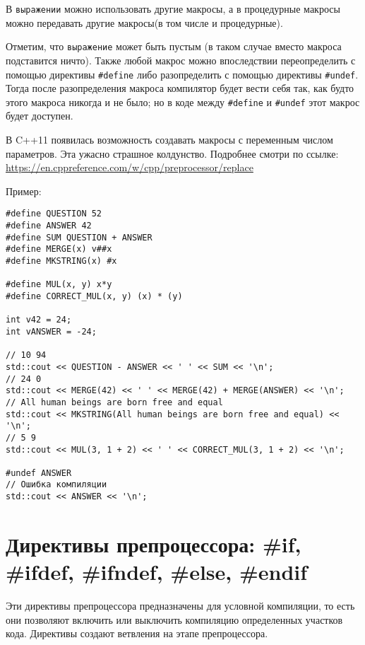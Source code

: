 \documentclass[14pt, a4paper]{extarticle}
\begin{document}
В \verb|выражении| можно использовать другие макросы, а в процедурные макросы можно передавать
другие макросы(в том числе и процедурные).

Отметим, что \verb|выражение| может быть пустым (в таком случае
вместо макроса подставится ничто). Также любой макрос можно впоследствии переопределить
с помощью директивы \verb|#define| либо разопределить с помощью директивы \verb|#undef|.
Тогда после разопределения макроса компилятор будет вести себя так, как будто этого
макроса никогда и не было; но в коде между \verb|#define| и \verb|#undef| этот макрос
будет доступен.

{\small В C++11 появилась возможность создавать макросы с переменным числом параметров.
Эта ужасно страшное колдунство. Подробнее смотри по ссылке:
\url{https://en.cppreference.com/w/cpp/preprocessor/replace}}

Пример:
\begin{verbatim}
#define QUESTION 52
#define ANSWER 42
#define SUM QUESTION + ANSWER
#define MERGE(x) v##x
#define MKSTRING(x) #x

#define MUL(x, y) x*y
#define CORRECT_MUL(x, y) (x) * (y)

int v42 = 24;
int vANSWER = -24;

// 10 94
std::cout << QUESTION - ANSWER << ' ' << SUM << '\n';
// 24 0
std::cout << MERGE(42) << ' ' << MERGE(42) + MERGE(ANSWER) << '\n';
// All human beings are born free and equal
std::cout << MKSTRING(All human beings are born free and equal) << '\n';
// 5 9
std::cout << MUL(3, 1 + 2) << ' ' << CORRECT_MUL(3, 1 + 2) << '\n';

#undef ANSWER
// Ошибка компиляции
std::cout << ANSWER << '\n';
\end{verbatim}


\section{Директивы препроцессора: \#if, \#ifdef, \#ifndef, \#else, \#endif}
Эти директивы препроцессора предназначены для условной компиляции, то есть они позволяют
включить или выключить компиляцию определенных участков кода. Директивы создают ветвления
на этапе препроцессора.
\end{document}
